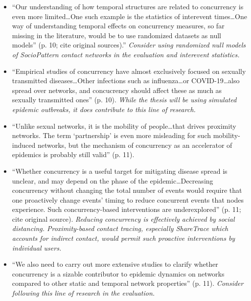 \begin{itemize}
\begin{itemize}
		\item ``Our understanding of how temporal structures are related to concurrency is even more limited{\ldots}One such example is the statistics of interevent times{\ldots}One way of understanding temporal effects on concurrency measures, so far missing in the literature, would be to use randomized datasets as null models'' (p. 10; cite original sources).'' \emph{Consider using randomized null models of SocioPattern contact networks in the evaluation and interevent statistics.}
		\item ``Empirical studies of concurrency have almost exclusively focused on sexually transmitted diseases{\ldots}Other infections such as influenza{\ldots}or COVID-19{\ldots}also spread over networks, and concucrency should affect these as much as sexually transmitted ones'' (p. 10). \emph{While the thesis will be using simulated epidemic outbreaks, it does contribute to this line of research.}
		\item ``Unlike sexual networks, it is the mobility of people{\ldots}that drives proximity networks. The term `partnership' is even more misleading for such mobility-induced networks, but the mechanism of concurrency as an accelerator of epidemics is probably still valid'' (p. 11).
		\item ``Whether concurrency is a useful target for mitigating disease spread is unclear, and may depend on the phase of the epidemic{\ldots}Decreasing concurrency without changing the total number of events would require that one proactively change events' timing to reduce concurrent events that nodes experience. Such concurrency-based interventions are underexplored'' (p. 11; cite original source). \emph{Reducing concurrency is effectively achieved by social distancing. Proximity-based contact tracing, especially ShareTrace which accounts for indirect contact, would permit such proactive interventions by individual users.}
		\item ``We also need to carry out more extensive studies to clarify whether concurrency is a sizable contributor to epidemic dynamics on networks compared to other static and temporal network properties'' (p. 11). \emph{Consider following this line of research in the evaluation.}
	\end{itemize}
\end{itemize}

